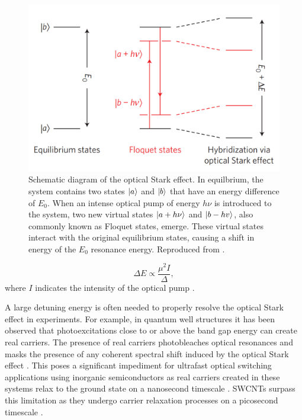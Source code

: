 \begin{figure}[ht]
	\centering
	\includegraphics[scale=0.3]{images/chapter_prior_works/optical_stark_effect_sie_2014}
	\caption{Schematic diagram of the optical Stark effect. In equilbrium, the system contains two states $\ket{a}$ and $\ket{b}$ that have an energy difference of $E_0$. When an intense optical pump of energy $h \nu$ is introduced to the system, two new virtual states $\ket{a + h \nu }$ and $\ket{b - hv}$, also commonly known as Floquet states, emerge. These virtual states interact with the original equilibrium states, causing a shift in energy of the $E_0$ resonance energy. Reproduced from \cite{sie2015valley}.}
	\label{fig:optical_stark_effect_schematic_sie}
\end{figure}


\begin{equation}
		\Delta E \propto \frac{\mu^2 I}{\Delta},
		\label{eq:ose_blueshift}
\end{equation}
where $I$ indicates the intensity of the optical pump \cite{combescot1992semiconductors}.

A large detuning energy is often needed to properly resolve the optical Stark effect in experiments. For example, in quantum well structures it has been observed that photoexcitations close to or above the band gap energy can create real carriers. The presence of real carriers photobleaches optical resonances and masks the presence of any coherent spectral shift induced by the optical Stark effect \cite{peyghambarian1984blue}. This poses a significant impediment for ultrafast optical switching applications using inorganic semiconductors as real carriers created in these systems relax to the ground state on a nanosecond timescale \cite{maeda2006gigantic}. SWCNTs surpass this limitation as they undergo carrier relaxation processes on a picosecond timescale \cite{ostojic2004interband, wang2004observation, manzoni2005intersubband, maeda2006gigantic}.

